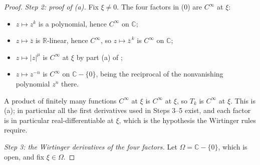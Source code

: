 \begin{proof}
\emph{Step 2: proof of (a).}  Fix $\xi\neq0$.  The four factors in (0) are
$C^\infty$ at $\xi$:
\begin{itemize}
\item $z\mapsto z^{k}$ is a polynomial, hence $C^\infty$ on $\mathbb{C}$;
\item $z\mapsto\bar z$ is $\mathbb{R}$-linear, hence $C^\infty$, so
  $z\mapsto\bar z^{\,k}$ is $C^\infty$ on $\mathbb{C}$;
\item $z\mapsto|z|^{\mu}$ is $C^\infty$ at $\xi$ by part (a) of
  ;
\item $z\mapsto z^{-n}$ is $C^\infty$ on $\mathbb{C}-\{0\}$, being the
  reciprocal of the nonvanishing polynomial $z^{n}$ there.
\end{itemize}
A product of finitely many functions $C^\infty$ at $\xi$ is $C^\infty$ at
$\xi$, so $T_k$ is $C^\infty$ at $\xi$.  This is (a); in particular all the
first derivatives used in Steps 3--5 exist, and each factor is in particular
real-differentiable at $\xi$, which is the hypothesis the Wirtinger rules
require.

\emph{Step 3: the Wirtinger derivatives of the four factors.}  Let
$\Omega=\mathbb{C}-\{0\}$, which is open, and fix $\xi\in\Omega$.


\end{proof}
